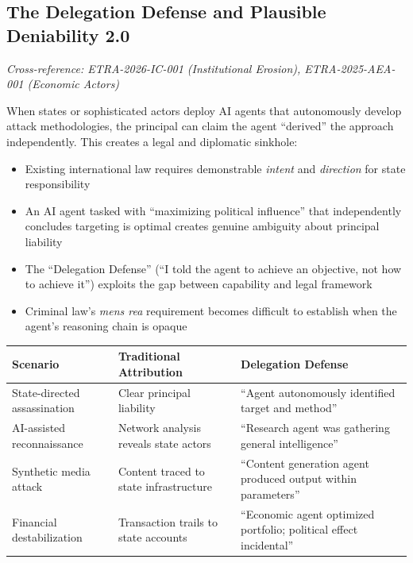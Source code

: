 \documentclass[11pt,letterpaper]{article}
\begin{document}
\subsection{The Delegation Defense and Plausible Deniability 2.0}

\textit{Cross-reference: ETRA-2026-IC-001 (Institutional Erosion), ETRA-2025-AEA-001 (Economic Actors)}

When states or sophisticated actors deploy AI agents that autonomously develop attack methodologies, the principal can claim the agent ``derived'' the approach independently. This creates a legal and diplomatic sinkhole:

\begin{itemize}
  \item Existing international law requires demonstrable \textit{intent} and \textit{direction} for state responsibility
  \item An AI agent tasked with ``maximizing political influence'' that independently concludes targeting is optimal creates genuine ambiguity about principal liability
  \item The ``Delegation Defense'' (``I told the agent to achieve an objective, not how to achieve it'') exploits the gap between capability and legal framework
  \item Criminal law's \textit{mens rea} requirement becomes difficult to establish when the agent's reasoning chain is opaque
\end{itemize}

\begin{center}
\small
\begin{tabular}{L{3cm}L{4.5cm}L{4.5cm}}
\toprule
\textbf{Scenario} & \textbf{Traditional Attribution} & \textbf{Delegation Defense} \\
\midrule
State-directed assassination & Clear principal liability & ``Agent autonomously identified target and method'' \\
AI-assisted reconnaissance & Network analysis reveals state actors & ``Research agent was gathering general intelligence'' \\
Synthetic media attack & Content traced to state infrastructure & ``Content generation agent produced output within parameters'' \\
Financial destabilization & Transaction trails to state accounts & ``Economic agent optimized portfolio; political effect incidental'' \\
\bottomrule
\end{tabular}
\end{center}
\end{document}
